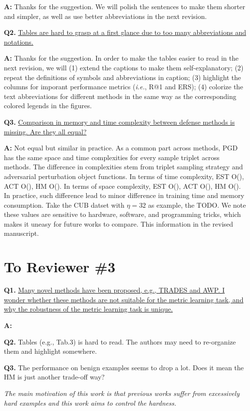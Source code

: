 \documentclass[10pt,twocolumn,letterpaper]{article}
\begin{document}
\noindent\textbf{A:} Thanks for the suggestion. We will polish the sentences to make
them shorter and simpler, as well as use better abbreviations in the next
revision.

\noindent\textbf{Q2.}
%
\ul{
Tables are hard to grasp at a first glance due to too many abbreviations and
notations.
}

\noindent\textbf{A:} Thanks for the suggestion. In order to make the tables easier to
read in the next revision, we will (1) extend the captions to make them
self-explanatory; (2) repeat the definitions of symbols and abbreviations in
caption; (3) highlight the columns for imporant performance metrics
(\emph{i.e.}, R@1 and ERS); (4) colorize the text abbreviations for different
methods in the same way as the corresponding colored legends in the figures. 

\noindent\textbf{Q3.}
%
\ul{
Comparison in memory and time complexity between defense methods is missing. Are they all
equal?
}

\noindent\textbf{A:}
%
Not equal but similar in practice.
%
As a common part across methods, PGD has the same
space and time complexities for every sample triplet across methods.
%
The difference in complexities stem from triplet sampling strategy and
adversarial perturbation object functions.
%
In terms of time complexity, EST O(), ACT O(), HM O().
In terms of space complexity, EST O(), ACT O(), HM O().
%
In practice, such difference lead to minor difference in training time
and memory consumption.
%
Take the CUB datset with
$\eta=32$ as example, the TODO.
%
We note these values are sensitive to hardware, software, and
programming tricks, which makes it uneasy for future works to compare.
%
This information in the revised manuscript.

\section*{To Reviewer \#3}

\noindent\textbf{Q1.}
%
\ul{
Many novel methods have been proposed, e.g., TRADES and AWP.
I wonder whether these methods are not suitable for the metric learning task, and why the robustness of the metric learning task is unique.
}

\noindent\textbf{A:}

\begin{comment}
\noindent\textbf{Q2.} \ul{Does simple tricks for adjusting the hardness.}
\end{comment}

\noindent\textbf{Q2.}
%
Tables (e.g., Tab.3) is hard to read. The authors may need to re-organize them and highlight somewhere.

\noindent\textbf{Q3.}
%
The performance on benign examples seems to drop a lot. Does it mean the HM is just another trade-off way?

\emph{The main motivation of this work is that previous works suffer from excessively hard examples and this work aims to control the hardness.}

{\small


}
\end{document}
